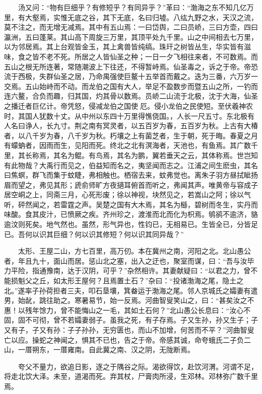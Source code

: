 　　汤又问：``物有巨细乎？有修短乎？有同异乎？''革曰：``渤海之东不知几亿万里，有大壑焉，实惟无底之谷，其下无底，名曰归墟。八纮九野之水，天汉之流，莫不注之，而无增无减焉。其中有五山焉：一曰岱舆，二曰员峤，三曰方壶，四曰瀛洲，五曰蓬莱。其山高下周旋三万里，其顶平处九千里。山之中间相去七万里，以为邻居焉。其上台观皆金玉，其上禽兽皆纯缟。珠玕之树皆丛生，华实皆有滋味，食之皆不老不死。所居之人皆仙圣之种；一日一夕飞相往来者，不可数焉。而五山之根无所连著，常随潮波上下往还，不得暂峙焉。仙圣毒之，诉之于帝。帝恐流于西极，失群仙圣之居，乃命禺强使巨鳌十五举首而戴之。迭为三番，六万岁一交焉。五山始峙而不动。而龙伯之国有大人，举足不盈数步而暨五山之所，一钓而连六鳌，合负而趣，归其国，灼其骨以数焉。员峤二山流于北极，沈于大海，仙圣之播迁者巨亿计。帝凭怒，侵减龙伯之国使厄。侵小龙伯之民使短。至伏羲神农时，其国人犹数十丈。从中州以东四十万里得憔侥国。，人长一尺五寸。东北极有人名曰诤人，长九寸。荆之南有冥灵者，以五百岁为春，五百岁为秋。上古有大椿者，以八千岁为春，八千岁为秋。朽壤之上有菌芝者，生于朝，死于晦。春夏之月有蠓蚋者，因雨而生，见阳而死。终北之北有溟海者，天池也，有鱼焉。其广数千里，其长称焉，其名为鲲。有鸟焉，其名为鹏，翼若垂天之云，其体称焉。世岂知有此物哉？大禹行而见之，伯益知而名之，夷坚闻而志之。江浦之间生麽虫，其名曰焦螟，群飞而集于蚊睫，弗相触也。栖宿去来，蚊弗觉也。离朱子羽方昼拭眦扬眉而望之，弗见其形；虒俞师旷方夜擿耳俯首而听之，弗闻其声。唯黄帝与容成子居空峒之上，同斋三月，心死形废；徐以神视，块然见之，若嵩山之阿；徐以气听，砰然闻之，若雷霆之声。吴楚之国有大木焉，其名为櫾，碧树而冬生，实丹而味酸。食其皮汁，已愤厥之疾。齐州珍之，渡淮而北而化为枳焉。鸲鹆不逾济，貉逾汶则死矣。地气然也。虽然，形气异也，性钧已，无相易已。生皆全已，分皆足已。吾何以识其巨细？何以识其修短？何以识其同异哉？''

　　太形、王屋二山，方七百里，高万仞。本在冀州之南，河阳之北。北山愚公者，年且九十，面山而居。惩山北之塞，出入之迂也，聚室而谋，曰：``吾与汝毕力平险，指通豫南，达于汉阴，可乎？''杂然相许。其妻献疑曰：``以君之力，曾不能损魁父之丘，如太形王屋何？且焉置土石？''杂曰：``投诸渤海之尾，隐土之北。''遂率子孙荷担者三夫，叩石垦壤，箕畚运于渤海之尾。邻人京城氏之孀妻有遣男，始龀，跳往助之。寒暑易节，始一反焉。河曲智叟笑山之，曰：``甚矣汝之不惠！以残年馀力，曾不能悔山之一毛，其如土石何？''北山愚公长息曰：``汝心不固，固不可彻，曾不若孀妻弱子。虽我之死，有子存焉。子又生孙，孙又生子；子又有子，子又有孙：子子孙孙，无穷匮也，而山不加增，何苦而不平？''河曲智叟亡以应。操蛇之神闻之，惧其不已也，告之于帝。帝感其诚，命夸蛾氏二子负二山，一厝朔东，一厝雍南。自此冀之南、汉之阴，无陇断焉。

　　夸父不量力，欲追日影，逐之于隅谷之际。渴欲得饮，赴饮河渭。河谓不足，将走北饮大泽。未至，道渴而死。弃其杖，尸膏肉所浸，生邓林。邓林弥广数千里焉。

